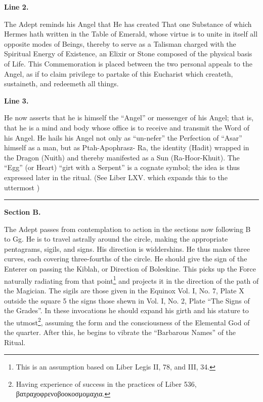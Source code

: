 \textbf{Line 2.}


The Adept reminds his Angel that He has created That one Substance of which Hermes hath written in the Table of Emerald, whose virtue is to unite in itself all opposite modes of Beings, thereby to serve as a Talisman charged with the Spiritual Energy of Existence, an Elixir or Stone composed of the physical basis of Life. This Commemoration is placed between the two personal appeals to the Angel, as if to claim privilege to partake of this Eucharist which createth, sustaineth, and redeemeth all things.


\textbf{Line 3.}

He now asserts that he is himself the \enquote{Angel} or messenger of his Angel; that is, that he is a mind and body whose office is to receive and transmit the Word of his Angel. He hails his Angel not only as \enquote{un-nefer} the Perfection of \enquote{Asar} himself as a man, but as Ptah-Apophrasz- Ra, the identity (Hadit) wrapped in the Dragon (Nuith) and thereby manifested as a Sun (Ra-Hoor-Khuit). The \enquote{Egg} (or Heart) \enquote{girt with a Serpent} is a cognate symbol; the idea is thus expressed later in the ritual. (See Liber LXV. which expands this to the uttermost )

{\centering
\rule{1in}{0.5pt}
\par}

\pagebreak[1]
\textbf{Section B.}

The Adept passes from contemplation to action in the sections now following B to Gg. He is to travel astrally around the circle, making the appropriate pentagrams, sigils, and signs. His direction is widdershins. He thus makes three curves, each covering three-fourths of the circle. He should give the sign of the Enterer on passing the Kiblah, or Direction of Boleskine. This picks up the Force naturally radiating from that point\footnote{This is an assumption based on Liber Legis II, 78, and III, 34.} and projects it in the direction of the path of the Magician. The sigils are those given in the Equinox Vol. I, No. 7, Plate X outside the square 5 the signs those shewn in Vol. I, No. 2, Plate \enquote{The Signs of the Grades}. In these invocations he should expand his girth and his stature to the utmost\footnote{Having experience of success in the practices of Liber 536, \textgreek{βατραχοφρενοβοοκοσμομαχια}.}, assuming the form and the consciousness of the Elemental God of the quarter. After this, he begins to vibrate the \enquote{Barbarous Names} of the Ritual.

